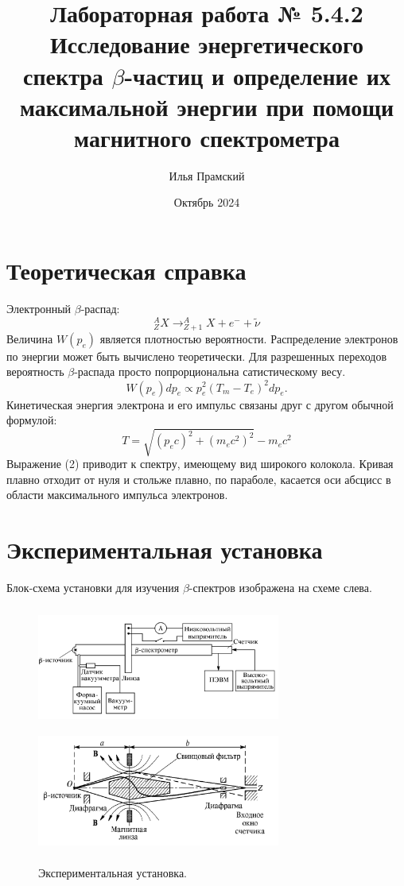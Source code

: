 \documentclass[a4paper,12pt]{article}
\title{Лабораторная работа № 5.4.2\\Исследование энергетического спектра $\beta$-частиц и определение их максимальной энергии при помощи магнитного спектрометра}
\author{Илья Прамский}
\date{Октябрь 2024}
\begin{document}
\maketitle
\newpage
\section{Теоретическая справка}
Электронный $\beta$-распад:
\begin{equation}
^A_ZX \rightarrow ^A_{Z+1}X + e^- + \widetilde{\nu}
\end{equation}
Величина $W(p_e)$ является плотностью вероятности. Распределение электронов по энергии может быть вычислено теоретически. Для разрешенных переходов вероятность $\beta$-распада просто попрорциональна сатистическому весу.
	\begin{equation}
		\label{eq:W}
		W(p_e)dp_e \propto p_e^2(T_m-T_e)^2 dp_e.
	\end{equation}
	Кинетическая энергия электрона и его импульс связаны друг с другом обычной формулой:
	\begin{equation*}
		T = \sqrt{(p_ec)^2+(m_ec^2)^2}-m_ec^2
	\end{equation*}
	Выражение (2) приводит к спектру, имеющему вид широкого колокола. Кривая плавно отходит от нуля и стольже плавно, по параболе, касается оси абсцисс в области максимального импульса электронов.
	
\section{Экспериментальная установка}
	Блок-схема установки для изучения $\beta$-спектров изображена на схеме слева.
	
	\begin{figure}[h!]
				{\includegraphics[width=8cm,height=4cm]{shema.png}{\label{pic1}}}
				{\includegraphics[width=8cm,height=4cm]{ustanovka.png}{\label{pic2}}}         
		{\caption*{Экспериментальная установка.}}
	\end{figure}
\end{document}
